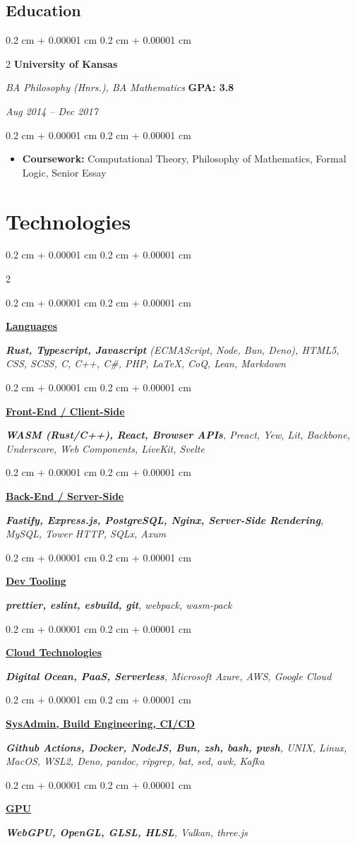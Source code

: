 \documentclass[10pt, letterpaper]{article}
\newenvironment{highlights}{ \begin{itemize}[ topsep=0.10 cm, parsep=0.10 cm, partopsep=0pt,
itemsep=0pt, leftmargin=0.4 cm + 10pt ] }{ \end{itemize} } %
\newenvironment{onecolentry}{ \begin{adjustwidth}{ 0.2 cm + 0.00001 cm }{ 0.2 cm + 0.00001 cm }
}{ \end{adjustwidth}} %
\newenvironment{twocolentry}[2][]{ \onecolentry \def\secondColumn{#2} \setcolumnwidth{\fill, 10 cm}
\begin{paracol}{2} }{ \switchcolumn \raggedleft \secondColumn \end{paracol}
\endonecolentry } %
\begin{document}
	\begin{samepage}
		\section{Education}

		\begin{twocolentry}
			{ \textbf{GPA: 3.8}

			\textit{Aug 2014 -- Dec 2017}} \textbf{University of Kansas}

			\textit{BA Philosophy (Hnrs.), BA Mathematics}
		\end{twocolentry}

		\vspace{0.10 cm}
		\begin{onecolentry}
			\begin{highlights}
				\item \textbf{Coursework:} Computational Theory, Philosophy of Mathematics,
				Formal Logic, Senior Essay
			\end{highlights}
		\end{onecolentry}
	\end{samepage}
	\section{Technologies}
	\newcommand{\skillList}[2]{\begin{onecolentry}
		\item[] \underline{\textbf{#1}} \item \textit{#2}
	\end{onecolentry}}
	\begin{twocolentry}
		{ \skillList {Cloud Technologies}%
		{\textbf{Digital Ocean, PaaS, Serverless}, Microsoft Azure, AWS, Google Cloud}

		\skillList {SysAdmin, Build Engineering, CI/CD}%
		{\textbf{Github Actions, Docker, NodeJS, Bun, zsh, bash, pwsh}, UNIX, Linux, MacOS, WSL2, Deno, pandoc, ripgrep, bat, sed, awk, Kafka }

		\skillList {GPU}%
		{\textbf{WebGPU, OpenGL, GLSL, HLSL}, Vulkan, three.js }%
		}%
		\skillList{Languages}%
		{\textbf{Rust, Typescript, Javascript} (ECMAScript, Node, Bun, Deno), HTML5, CSS, SCSS, C, C++, C\#, PHP, LaTeX, CoQ, Lean, Markdown}

		\skillList {Front-End / Client-Side}%
		{\textbf{WASM (Rust/C++), React, Browser APIs}, Preact, Yew, Lit, Backbone, Underscore, Web Components, LiveKit, Svelte }

		\skillList {Back-End / Server-Side}%
		{\textbf{Fastify, Express.js, PostgreSQL, Nginx, Server-Side Rendering}, MySQL, Tower HTTP, SQLx, Axum }

		\skillList {Dev Tooling}%
		{\textbf{prettier, eslint, esbuild, git}, webpack, wasm-pack }
	\end{twocolentry}
\end{document}
